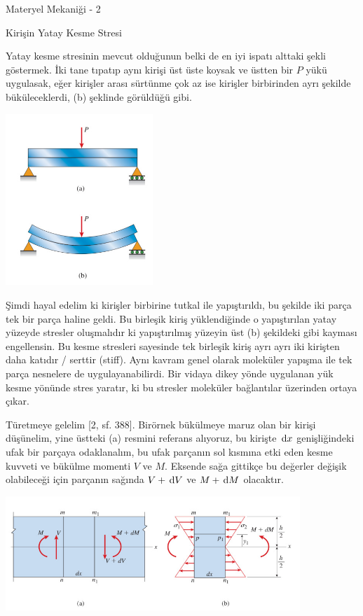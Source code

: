 \documentclass[12pt,fleqn]{article}\usepackage{../../common}
\begin{document}
Materyel Mekaniği - 2

Kirişin Yatay Kesme Stresi

Yatay kesme stresinin mevcut olduğunun belki de en iyi ispatı alttaki şekli
göstermek. İki tane tıpatıp aynı kirişi üst üste koysak ve üstten bir $P$ yükü
uygulasak, eğer kirişler arası sürtünme çok az ise kirişler birbirinden ayrı
şekilde büküleceklerdi, (b) şeklinde görüldüğü gibi.

\includegraphics[width=15em]{phy_020_strs_02_02.jpg}

Şimdi hayal edelim ki kirişler birbirine tutkal ile yapıştırıldı, bu şekilde iki
parça tek bir parça haline geldi. Bu birleşik kiriş yüklendiğinde o yapıştırılan
yatay yüzeyde stresler oluşmalıdır ki yapıştırılmış yüzeyin üst (b) şekildeki
gibi kayması engellensin. Bu kesme stresleri sayesinde tek birleşik kiriş ayrı
ayrı iki kirişten daha katıdır / serttir (stiff). Aynı kavram genel olarak
moleküler yapışma ile tek parça nesnelere de uygulayanabilirdi. Bir vidaya dikey
yönde uygulanan yük kesme yönünde stres yaratır, ki bu stresler moleküler
bağlantılar üzerinden ortaya çıkar.

Türetmeye gelelim [2, sf. 388]. Birörnek bükülmeye maruz olan bir kirişi
düşünelim, yine üstteki (a) resmini referans alıyoruz, bu kirişte $\,\mathrm{d} x$
genişliğindeki ufak bir parçaya odaklanalım, bu ufak parçanın sol kısmına etki
eden kesme kuvveti ve bükülme momenti $V$ ve $M$. Eksende sağa gittikçe bu
değerler değişik olabileceği için parçanın sağında $V + \,\mathrm{d} V$ ve $M + \,\mathrm{d} M$
olacaktır.

\includegraphics[width=30em]{phy_020_strs_02_01.jpg}
\end{document}
